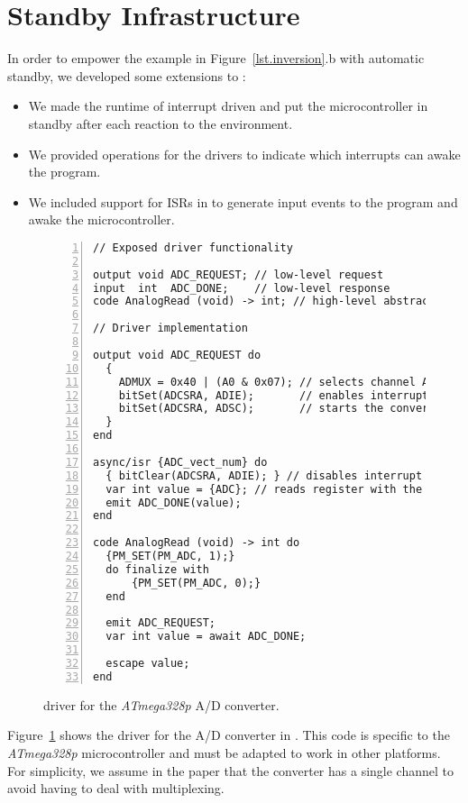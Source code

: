 \section{Standby Infrastructure}
\label{sec.standby}

In order to empower the example in Figure~\ref{lst.inversion}.b with automatic
standby, we developed some extensions to \CEU:
%
\begin{itemize}
\item We made the runtime of \CEU interrupt driven and put the microcontroller
      in standby after each reaction to the environment.
\item We provided operations for the drivers to indicate which interrupts can
      awake the program.
\item We included support for ISRs in \CEU to generate input events to the
      program and awake the microcontroller.
\end{itemize}

\begin{figure}[t]
\begin{lstlisting}[numbers=left]
// Exposed driver functionality

output void ADC_REQUEST; // low-level request
input  int  ADC_DONE;    // low-level response
code AnalogRead (void) -> int; // high-level abstraction

// Driver implementation

output void ADC_REQUEST do
  {
    ADMUX = 0x40 | (A0 & 0x07); // selects channel A0
    bitSet(ADCSRA, ADIE);       // enables interrupt
    bitSet(ADCSRA, ADSC);       // starts the conversion
  }
end

async/isr {ADC_vect_num} do
  { bitClear(ADCSRA, ADIE); } // disables interrupt
  var int value = {ADC}; // reads register with the value
  emit ADC_DONE(value);
end

code AnalogRead (void) -> int do
  {PM_SET(PM_ADC, 1);}
  do finalize with
      {PM_SET(PM_ADC, 0);}
  end

  emit ADC_REQUEST;
  var int value = await ADC_DONE;

  escape value;
end
\end{lstlisting}
\caption{ \CEU driver for the \emph{ATmega328p} A/D converter.
\label{lst.adc}
}
\end{figure}

Figure~\ref{lst.adc} shows the driver for the A/D converter in \CEU.
This code is specific to the \emph{ATmega328p} microcontroller and must be
adapted to work in other platforms.
For simplicity, we assume in the paper that the converter has a single channel
to avoid having to deal with multiplexing.

